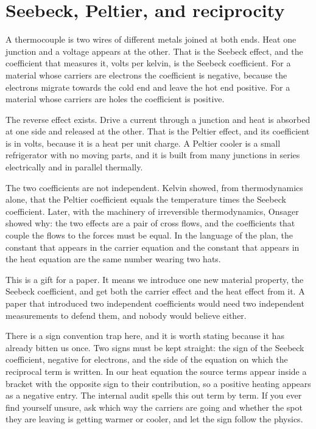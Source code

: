 \documentclass[11pt]{article}
\begin{document}
\section{Seebeck, Peltier, and reciprocity}

A thermocouple is two wires of different metals joined at both ends. Heat one junction and a voltage appears
at the other. That is the Seebeck effect, and the coefficient that measures it, volts per kelvin, is the
Seebeck coefficient. For a material whose carriers are electrons the coefficient is negative, because the
electrons migrate towards the cold end and leave the hot end positive. For a material whose carriers are
holes the coefficient is positive.

The reverse effect exists. Drive a current through a junction and heat is absorbed at one side and released
at the other. That is the Peltier effect, and its coefficient is in volts, because it is a heat per unit
charge. A Peltier cooler is a small refrigerator with no moving parts, and it is built from many junctions in
series electrically and in parallel thermally.

The two coefficients are not independent. Kelvin showed, from thermodynamics alone, that the Peltier
coefficient equals the temperature times the Seebeck coefficient. Later, with the machinery of irreversible
thermodynamics, Onsager showed why: the two effects are a pair of cross flows, and the coefficients that
couple the flows to the forces must be equal. In the language of the plan, the constant that appears in the
carrier equation and the constant that appears in the heat equation are the same number wearing two hats.

This is a gift for a paper. It means we introduce one new material property, the Seebeck coefficient, and get
both the carrier effect and the heat effect from it. A paper that introduced two independent coefficients
would need two independent measurements to defend them, and nobody would believe either.

There is a sign convention trap here, and it is worth stating because it has already bitten us once. Two
signs must be kept straight: the sign of the Seebeck coefficient, negative for electrons, and the side of the
equation on which the reciprocal term is written. In our heat equation the source terms appear inside a
bracket with the opposite sign to their contribution, so a positive heating appears as a negative entry. The
internal audit spells this out term by term. If you ever find yourself unsure, ask which way the carriers are
going and whether the spot they are leaving is getting warmer or cooler, and let the sign follow the physics.
\end{document}
